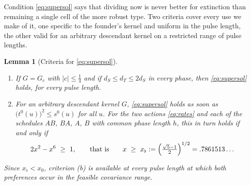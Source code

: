 \documentclass[11pt]{article}
\theoremstyle{plain}
\newtheorem{lemma}[theorem]{Lemma}
\theoremstyle{definition}
\theoremstyle{remark}
\begin{document}
Condition \eqref{eq:supersol} says that dividing now is never better for
extinction than remaining a single cell of the more robust type. Two criteria
cover every use we make of it, one specific to the founder's kernel and
uniform in the pulse length, the other valid for an arbitrary descendant
kernel on a restricted range of pulse lengths.

\begin{lemma}[Criteria for \eqref{eq:supersol}]\label{lem:criteria}
\hfill
\begin{enumerate}[nosep,leftmargin=*,label=(\alph*)]
\item If $G=G_c$ with $|c|\le\tfrac14$ and if $d_S\le d_T\le2d_S$ in every
      phase, then \eqref{eq:supersol} holds, for every pulse length.
\item For an \emph{arbitrary} descendant kernel $G$, \eqref{eq:supersol} holds
      as soon as $\bigl(t^0(u)\bigr)^2\le s^0(u)$ for all $u$. For the two
      actions \eqref{eq:rates} and each of the schedules $AB$, $BA$, $A$, $B$
      with common phase length $h$, this in turn holds if and only if
      \begin{equation}\label{eq:xflat}
       2x^2-x^6\ \ge\ 1,\qquad\text{that is}\qquad
       x\ \ge\ x_\flat:=\Bigl(\tfrac{\sqrt5-1}{2}\Bigr)^{1/2}=.7861513\ldots
      \end{equation}
\end{enumerate}
Since $x_\flat<x_0$, criterion (b) is available at \emph{every} pulse length at
which both preferences occur in the feasible covariance range.
\end{lemma}
\end{document}

